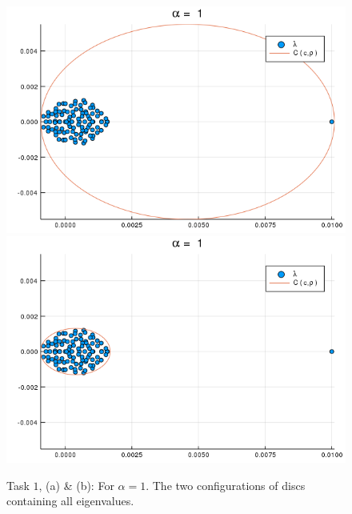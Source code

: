 \begin{figure}[h!]
\centering
\includegraphics[scale=0.4]{../task2/images/Task2_b_a1_1.png}
\includegraphics[scale=0.4]{../task2/images/Task2_b_a1_2.png}
\caption{Task $1$, (a) \& (b): For $\alpha = 1$. The two configurations of discs containing all eigenvalues.}
\label{fig:task2b_1}
\end{figure}

